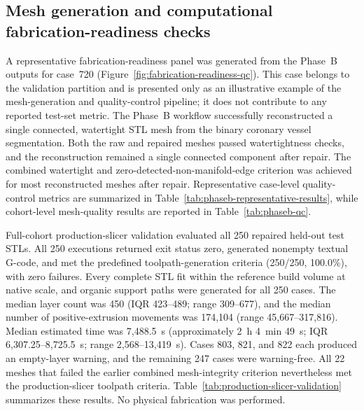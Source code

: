 \documentclass[anonymous]{iopjournal}
\begin{document}
\Needspace{0.48\textheight}
\subsection{Mesh generation and computational fabrication-readiness checks}
\label{subsec:mesh-results}

A representative fabrication-readiness panel was generated from the Phase~B outputs for case~720 (Figure~\ref{fig:fabrication-readiness-qc}). This case belongs to the validation partition and is presented only as an illustrative example of the mesh-generation and quality-control pipeline; it does not contribute to any reported test-set metric. The Phase~B workflow successfully reconstructed a single connected, watertight STL mesh from the binary coronary vessel segmentation. Both the raw and repaired meshes passed watertightness checks, and the reconstruction remained a single connected component after repair. The combined watertight and zero-detected-non-manifold-edge criterion was achieved for most reconstructed meshes after repair. Representative case-level quality-control metrics are summarized in Table~\ref{tab:phaseb-representative-results}, while cohort-level mesh-quality results are reported in Table~\ref{tab:phaseb-qc}.

Full-cohort production-slicer validation evaluated all 250 repaired held-out test STLs. All 250 executions returned exit status zero, generated nonempty textual G-code, and met the predefined toolpath-generation criteria (250/250, 100.0\%), with zero failures. Every complete STL fit within the reference build volume at native scale, and organic support paths were generated for all 250 cases. The median layer count was 450 (IQR 423--489; range 309--677), and the median number of positive-extrusion movements was 174{,}104 (range 45{,}667--317{,}816). Median estimated time was 7{,}488.5~s (approximately 2~h 4~min 49~s; IQR 6{,}307.25--8{,}725.5~s; range 2{,}568--13{,}419~s). Cases 803, 821, and 822 each produced an empty-layer warning, and the remaining 247 cases were warning-free. All 22 meshes that failed the earlier combined mesh-integrity criterion nevertheless met the production-slicer toolpath criteria. Table~\ref{tab:production-slicer-validation} summarizes these results. No physical fabrication was performed.
\end{document}

